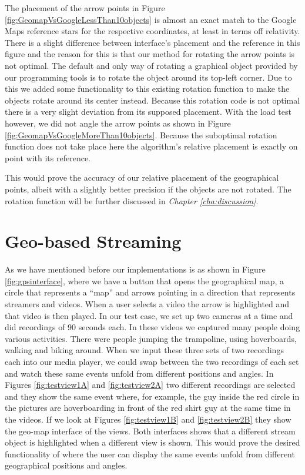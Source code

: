 The placement of the arrow points in Figure \ref{fig:GeomapVsGoogleLessThan10objects} is almost an exact match to the Google Maps reference stars for the respective coordinates, at least in terms off relativity. There is a slight difference between interface's placement and the reference in this figure and the reason for this is that our method for rotating the arrow points is not optimal. The default and only way of rotating a graphical object provided by our programming tools is to rotate the object around its top-left corner. Due to this we added some functionality to this existing rotation function to make the objects rotate around its center instead. Because this rotation code is not optimal there is a very slight deviation from its supposed placement. With the load test however, we did not angle the arrow points as shown in Figure \ref{fig:GeomapVsGoogleMoreThan10objects}. Because the suboptimal rotation function does not take place here the algorithm's relative placement is exactly on point with its reference.

This would prove the accuracy of our relative placement of the geographical points, albeit with a slightly better precision if the objects are not rotated. The rotation function will be further discussed in \textit{Chapter \ref{cha:discussion}}.

\section{Geo-based Streaming}
\label{sec:geobasedstreaming}

As we have mentioned before our implementations is as shown in Figure \ref{fig:gpsinterface}, where we have a button that opens the geographical map, a circle that represents a “map” and arrows pointing in a direction that represents streamers and videos. When a user selects a video the arrow is highlighted and that video is then played. In our test case, we set up two cameras at a time and did recordings of 90 seconds each. In these videos we captured many people doing various activities. There were people jumping the trampoline, using hoverboards, walking and biking around. When we input these three sets of two recordings each into our media player, we could swap between the two recordings of each set and watch these same events unfold from different positions and angles. In Figures \ref{fig:testview1A} and \ref{fig:testview2A} two different recordings are selected and they show the same event where, for example, the guy inside the red circle in the pictures are hoverboarding in front of the red shirt guy at the same time in the videos. If we look at Figures \ref{fig:testview1B} and \ref{fig:testview2B} they show the geo-map interface of the views. Both interfaces shows that a different stream object is highlighted when a different view is shown. This would prove the desired functionality of where the user can display the same events unfold from different geographical positions and angles.

